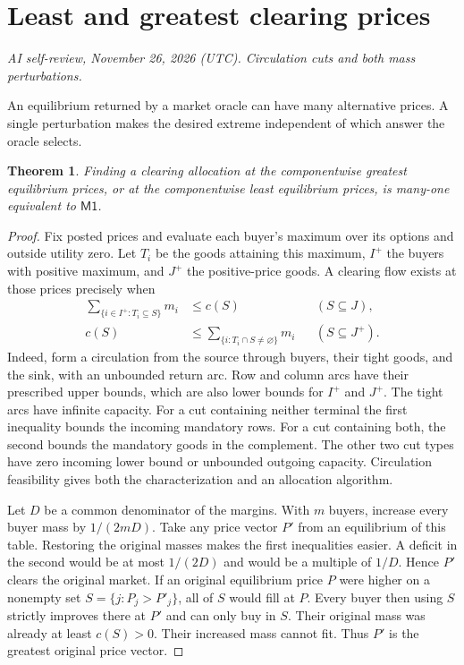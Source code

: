 \documentclass[11pt,oneside,openany,notitlepage]{report}
\newtheorem{theorem}{Theorem}[chapter]
\newcommand{\Market}{\mathsf{M1}}
\newcommand{\reviewdate}{November 26, 2026 (UTC)}
\newcommand{\reviewmark}[1]{\par\nopagebreak[4]\noindent
  {\footnotesize\itshape AI self-review, \reviewdate. #1\par}\nobreak\smallskip}
\begin{document}
\section{Least and greatest clearing prices}
\reviewmark{Circulation cuts and both mass perturbations.}

An equilibrium returned by a market oracle can have many alternative
prices. A single perturbation makes the desired extreme independent of
which answer the oracle selects.

\begin{theorem}\label{thm:extreme}
Finding a clearing allocation at the componentwise greatest equilibrium
prices, or at the componentwise least equilibrium prices, is many-one
equivalent to \(\Market\).
\end{theorem}
\begin{proof}
Fix posted prices and evaluate each buyer's maximum over its options and
outside utility zero. Let \(T_i\) be the goods attaining this maximum,
\(I^+\) the buyers with positive maximum, and \(J^+\) the positive-price
goods. A clearing flow exists at those prices precisely when
\begin{align*}
 \sum_{\{i\in I^+:T_i\subseteq S\}}m_i&\le c(S)
     &&(S\subseteq J),\\
 c(S)&\le\sum_{\{i:T_i\cap S\ne\varnothing\}}m_i
     &&(S\subseteq J^+).
\end{align*}
Indeed, form a circulation from the source through buyers, their tight
goods, and the sink, with an unbounded return arc. Row and column arcs
have their prescribed upper bounds, which are also lower bounds for
\(I^+\) and \(J^+\). The tight arcs have infinite capacity. For a cut
containing neither terminal the first inequality bounds the incoming
mandatory rows. For a cut containing both, the second bounds the
mandatory goods in the complement. The other two cut types have zero
incoming lower bound or unbounded outgoing capacity. Circulation
feasibility gives both the characterization and an allocation algorithm.

Let \(D\) be a common denominator of the margins. With \(m\) buyers,
increase every buyer mass by \(1/(2mD)\). Take any price vector \(P'\) from
an equilibrium of this table. Restoring the original masses makes the
first inequalities easier. A deficit in the second would be at most
\(1/(2D)\) and would be a multiple of \(1/D\). Hence \(P'\) clears the
original market. If an original equilibrium price \(P\) were higher on a
nonempty set \(S=\{j:P_j>P'_j\}\), all of \(S\) would fill at \(P\).
Every buyer then using \(S\) strictly improves there at \(P'\) and can
only buy in \(S\). Their original mass was already at least \(c(S)>0\).
Their increased mass cannot fit. Thus \(P'\) is the greatest original
price vector.


\end{proof}
\end{document}
